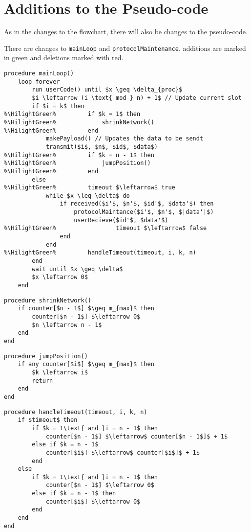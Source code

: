\section{Additions to the Pseudo-code}
As in the changes to the flowchart, there will also be changes to the pseudo-code. 

There are changes to \texttt{mainLoop} and \texttt{protocolMaintenance}, additions are marked in green and deletions marked with red.

\begin{lstlisting}[style=pseudocode,mathescape=true,float, label={lst:general_case2}, caption={Modifications to the previous pseudocode are highlighted in green.}, escapechar=\%] 
procedure mainLoop()
	loop forever
		run userCode() until $x \geq \delta_{proc}$
		$i \leftarrow (i \text{ mod } n) + 1$ // Update current slot
		if $i = k$ then
%\HilightGreen%			if $k = 1$ then
%\HilightGreen%				shrinkNetwork()
%\HilightGreen%			end
			makePayload() // Updates the data to be sendt
			transmit($i$, $n$, $id$, $data$)
%\HilightGreen%			if $k = n - 1$ then
%\HilightGreen%				jumpPosition()
%\HilightGreen%			end
		else
%\HilightGreen%			timeout $\leftarrow$ true
			while $x \leq \delta$ do
				if received($i'$, $n'$, $id'$, $data'$) then
					protocolMaintance($i'$, $n'$, $|data'|$)
					userRecieve($id'$, $data'$)
%\HilightGreen%					timeout $\leftarrow$ false
				end
			end
%\HilightGreen%			handleTimeout(timeout, i, k, n)
		end
		wait until $x \geq \delta$
		$x \leftarrow 0$ 
	end
\end{lstlisting} 

\begin{lstlisting}[style=pseudocode,mathescape=true,float, label={lst:general_case5}, caption={Pseudocode example of the main loop}] 
procedure shrinkNetwork()
	if counter[$n - 1$] $\geq m_{max}$ then
		counter[$n - 1$] $\leftarrow 0$
		$n \leftarrow n - 1$
	end
end
\end{lstlisting}

\begin{lstlisting}[style=pseudocode,mathescape=true,float, label={lst:general_case4}, caption={If any counter is over its limit, then move to its position in the next frame and reduce the size of the network}] 
procedure jumpPosition()
	if any counter[$i$] $\geq m_{max}$ then
		$k \leftarrow i$
		return
	end
end
\end{lstlisting}

\begin{lstlisting}[style=pseudocode,mathescape=true,float, label={lst:general_case3}, caption={This code handles counting how many times a given device has timed out. }]
procedure handleTimeout(timeout, i, k, n) 
	if $timeout$ then
		if $k = 1\text{ and }i = n - 1$ then
			counter[$n - 1$] $\leftarrow$ counter[$n - 1$]$ + 1$
		else if $k = n - 1$
			counter[$i$] $\leftarrow$ counter[$i$]$ + 1$
		end
	else 
		if $k = 1\text{ and }i = n - 1$ then
			counter[$n - 1$] $\leftarrow 0$
		else if $k = n - 1$ then
			counter[$i$] $\leftarrow 0$
		end
	end
end
\end{lstlisting}

